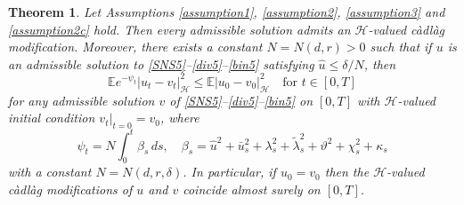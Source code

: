 \documentclass[11pt,reqno]{amsart}
\newtheorem{theorem}{Theorem}[section]
\theoremstyle{definition}
\theoremstyle{remark}
\newcommand\cH{\mathcal{H}}
\newcommand{\<}{\langle}
\renewcommand{\>}{\rangle}
\newcommand{\E}{\mathbb{E}}
\begin{document}
\begin{theorem}
                                            \label{theorem5}
Let Assumptions \ref{assumption1}, 
\ref{assumption2}, \ref{assumption3}  and \ref{assumption2c} hold.  
Then every admissible solution admits an $\cH$-valued c\`adl\`ag modification. 
Moreover,  there exists a constant 
$N=N(d,r)>0$
such that if $u$ is an admissible solution 
to \eqref{SNS5}--\eqref{div5}--\eqref{bin5} satisfying 
$\hat u\leq \delta/N$, then 
$$
\E e^{-\psi_{t}}|u_t-v_t|^2_{\cH}
\leq \E |u_0-v_0|_{\cH}^2\quad\text{for $t\in[0,T]$} 
$$
for any admissible solution $v$ of \eqref{SNS5}--\eqref{div5}--\eqref{bin5} 
on $[0,T]$ with $\cH$-valued initial condition 
$v_t|_{t=0}=v_0$, where 
$$
\psi_t=N\int_0^t\beta_s\,ds,
\quad 
\beta_s
=\hat u^2+\bar u_s^2+\lambda^2_s+\tilde\lambda^2_s+\vartheta^2+\chi^2_s+\kappa_s
$$
with a constant  $N=N(d,r,\delta)$. In particular, if $u_0=v_0$ 
then the $\cH$-valued c\`adl\`ag modifications 
of $u$ and $v$ coincide almost surely on  $[0,T]$. 
\end{theorem}
\end{document}
